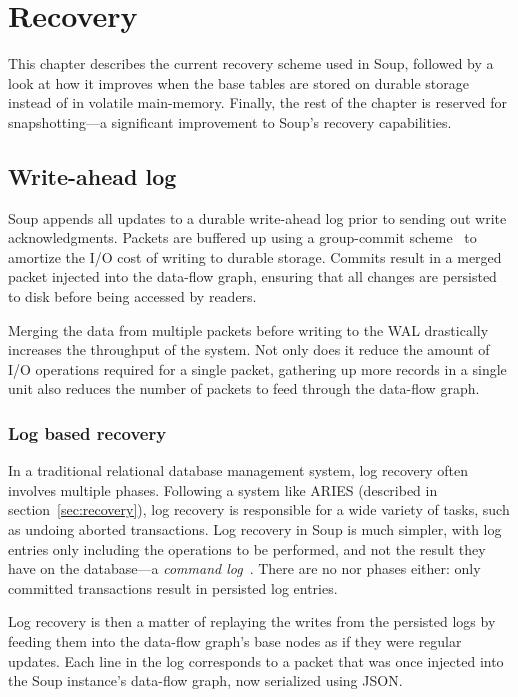 \chapter{Recovery}\label{chap:recovery}

This chapter describes the current recovery scheme used in Soup, followed by a
look at how it improves when the base tables are stored on durable storage
instead of in volatile main-memory. Finally, the rest of the chapter is reserved
for snapshotting---a significant improvement to Soup's recovery capabilities.

\newpage

\section{Write-ahead log}

Soup appends all updates to a durable write-ahead log prior to sending out write
acknowledgments. Packets are buffered up using a group-commit
scheme~\cite{main-memory} to amortize the I/O cost of writing to durable
storage. Commits result in a merged packet injected into the data-flow graph,
ensuring that all changes are persisted to disk before being accessed by
readers.

Merging the data from multiple packets before writing to the WAL drastically
increases the throughput of the system. Not only does it reduce the amount of
I/O operations required for a single packet, gathering up more records in a
single unit also reduces the number of packets to feed through the data-flow graph.


\subsection{Log based recovery}\label{sec:log-recovery}

In a traditional relational database management system, log recovery often
involves multiple phases. Following a system like ARIES (described in
section~\ref{sec:recovery}), log recovery is responsible for a wide variety of
tasks, such as undoing aborted transactions. Log recovery in Soup is much
simpler, with log entries only including the operations to be performed, and not
the result they have on the database---a \textit{command
log}~\cite{voltdb-recovery}. There are no  nor  phases
either: only committed transactions result in persisted log entries.

Log recovery is then a matter of replaying the writes from the persisted logs by
feeding them into the data-flow graph's base nodes as if they were regular
updates. Each line in the log corresponds to a packet that was once injected
into the Soup instance's data-flow graph, now serialized using JSON.\@

